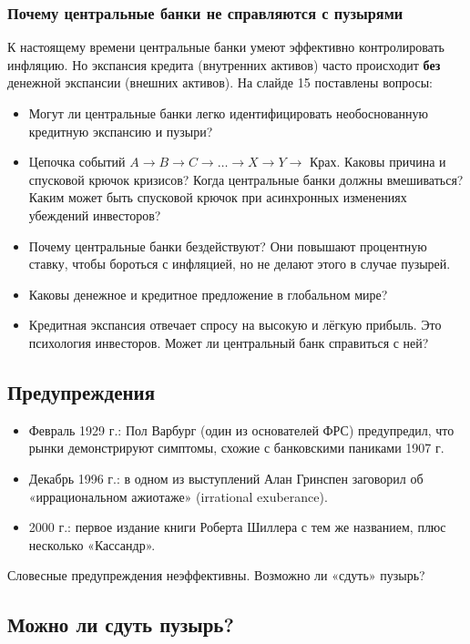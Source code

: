 \documentclass[10pt,a4paper]{article}
\begin{document}
\subsubsection{Почему центральные банки не справляются с пузырями}

К настоящему времени центральные банки умеют эффективно контролировать инфляцию. Но экспансия кредита (внутренних активов) часто происходит \textbf{без} денежной экспансии (внешних активов). На слайде 15 поставлены вопросы:
\begin{itemize}[leftmargin=1.3em]
\item Могут ли центральные банки легко идентифицировать необоснованную кредитную экспансию и пузыри?
\item Цепочка событий $A \to B \to C \to \dots \to X \to Y \to$ Крах. Каковы причина и спусковой крючок кризисов? Когда центральные банки должны вмешиваться? Каким может быть спусковой крючок при асинхронных изменениях убеждений инвесторов?
\item Почему центральные банки бездействуют? Они повышают процентную ставку, чтобы бороться с инфляцией, но не делают этого в случае пузырей.
\item Каковы денежное и кредитное предложение в глобальном мире?
\item Кредитная экспансия отвечает спросу на высокую и лёгкую прибыль. Это психология инвесторов. Может ли центральный банк справиться с ней?
\end{itemize}

\subsection{Предупреждения}

\begin{itemize}[leftmargin=1.3em]
\item Февраль 1929 г.: Пол Варбург (один из основателей ФРС) предупредил, что рынки демонстрируют симптомы, схожие с банковскими паниками 1907 г.
\item Декабрь 1996 г.: в одном из выступлений Алан Гринспен заговорил об «иррациональном ажиотаже» (irrational exuberance).
\item 2000 г.: первое издание книги Роберта Шиллера с тем же названием, плюс несколько «Кассандр».
\end{itemize}
Словесные предупреждения неэффективны. Возможно ли «сдуть» пузырь?

\subsection{Можно ли сдуть пузырь?}
\end{document}
